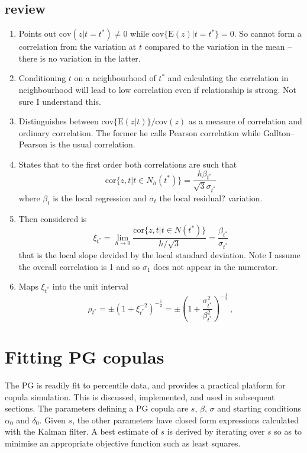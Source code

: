 \documentclass[authoryear]{elsarticle}
\newcommand{\E}{\mathrm{E}}
\newcommand{\cov}{\mathrm{cov}}
\newcommand{\cor}{\mathrm{cor}}
\begin{document}
\subsection{\cite{bjerve1993correlation} review}
\begin{enumerate}
\item  Points out $\cov(z|t=t^*)\ne 0$  while $\cov\{\E(z)|t=t^*\}=0$.  So cannot form a correlation from the variation at $t$ compared to the variation in the mean -- there is no variation in the latter.
\item  Conditioning $t$ on a neighbourhood of $t^*$ and calculating the correlation in neighbourhood will lead to low correlation even if relationship is strong.  Not sure I understand this.
\item  Distinguishes between $\cov\{\E(z|t)\}/\cov(z)$ as a measure of correlation and ordinary correlation.  The former he calls Pearson correlation while Gallton--Pearson is the usual correlation.
\item  States that to the first order  both correlations are such that
$$
\cor\{z,t|t\in N_h(t^*)\}=\frac{h\beta_{t^*}}{\sqrt 3\sigma_{t^*}}
$$
where $\beta_t$ is the local regression and $\sigma_t$ the local residual? variation.
\item Then considered is
$$
\xi_{t^*} = \lim_{h \rightarrow 0}\frac{\cor\{z,t|t\in N(t^*)\}}{h/\sqrt 3} = \frac{\beta_{t^*}}{\sigma_{t^*}}
$$
that is the local slope devided by the local standard deviation.  Note I  assume the overall correlation is 1 and so $\sigma_1$ does not appear in the numerator.
\item  Maps $\xi_{t^*}$ into the unit interval
$$
\rho_{t^*}= \pm\left(1+\xi^{-2}_{t^*}\right)^{-\frac{1}{2}}= \pm\left(1+\frac{\sigma^2_{t^*}}{\beta^2_{t^*}}\right)^{-\frac{1}{2}}\ ,
$$

\end{enumerate}


 

  


\section{Fitting PG copulas}
 The PG is readily  fit to percentile data, and provides a practical platform for copula simulation.  This is discussed, implemented, and used in subsequent sections.  The  parameters defining a PG copula are $s$, $\beta$,  $\sigma$ and starting conditions $\alpha_0$ and $\delta_0$.  Given $s$, the other parameters have  closed form expressions calculated with the Kalman filter.  A best estimate of $s$ is derived by iterating over $s$ so as to minimise  an appropriate objective function such as least squares. 
\end{document}

